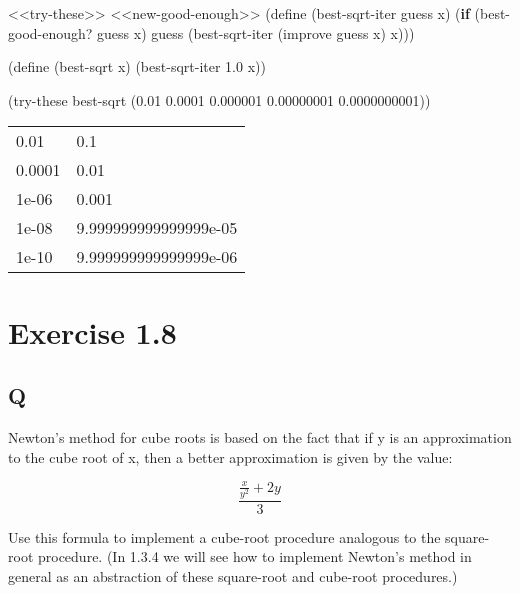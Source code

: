 \documentclass[
]{article}
\newenvironment{Shaded}{}{}
\newcommand{\ExtensionTok}[1]{#1}
\newcommand{\FloatTok}[1]{\textcolor[rgb]{0.25,0.63,0.44}{#1}}
\newcommand{\FunctionTok}[1]{\textcolor[rgb]{0.02,0.16,0.49}{#1}}
\newcommand{\KeywordTok}[1]{\textcolor[rgb]{0.00,0.44,0.13}{\textbf{#1}}}
\newcommand{\NormalTok}[1]{#1}
\begin{document}
\hypertarget{EX1-7-t3}{%
\label{EX1-7-t3}}%
\begin{Shaded}
\begin{Highlighting}[numbers=left,,]
\NormalTok{\textless{}\textless{}try{-}these\textgreater{}\textgreater{}}
\NormalTok{\textless{}\textless{}new{-}good{-}enough\textgreater{}\textgreater{}}
\NormalTok{(}\ExtensionTok{define}\FunctionTok{ }\NormalTok{(best{-}sqrt{-}iter guess x)}
\NormalTok{  (}\KeywordTok{if}\NormalTok{ (best{-}good{-}enough? guess x)}
\NormalTok{      guess}
\NormalTok{      (best{-}sqrt{-}iter (improve guess x) x)))}

\NormalTok{(}\ExtensionTok{define}\FunctionTok{ }\NormalTok{(best{-}sqrt x)}
\NormalTok{  (best{-}sqrt{-}iter }\FloatTok{1.0}\NormalTok{ x))}

\NormalTok{(try{-}these best{-}sqrt \textquotesingle{}(}\FloatTok{0.01} \FloatTok{0.0001} \FloatTok{0.000001} \FloatTok{0.00000001} \FloatTok{0.0000000001}\NormalTok{))}
\end{Highlighting}
\end{Shaded}

\begin{longtable}[]{@{}ll@{}}
\toprule
\endhead
0.01 & 0.1 \\
0.0001 & 0.01 \\
1e-06 & 0.001 \\
1e-08 & 9.999999999999999e-05 \\
1e-10 & 9.999999999999999e-06 \\
\bottomrule
\end{longtable}

\hypertarget{exercise-1.8}{%
\section{Exercise 1.8}\label{exercise-1.8}}

\hypertarget{q-7}{%
\subsection{Q}\label{q-7}}

Newton's method for cube roots is based on the fact that if y is an
approximation to the cube root of x, then a better approximation is
given by the value:

\begin{equation}
\frac{\frac{x}{y^2} + 2y}{3}
\end{equation}

Use this formula to implement a cube-root procedure analogous to the
square-root procedure. (In 1.3.4 we will see how to implement Newton's
method in general as an abstraction of these square-root and cube-root
procedures.)
\end{document}
